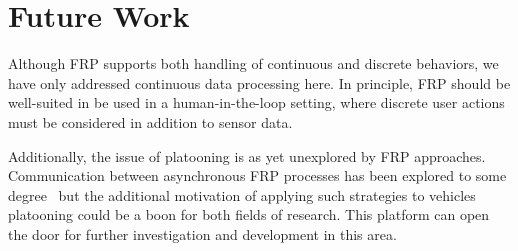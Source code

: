 \section{Future Work}

Although FRP supports both handling of continuous and discrete behaviors, we have only addressed continuous data processing here.
In principle, FRP should be well-suited in be used in a human-in-the-loop setting, where discrete user actions must be considered in addition to sensor data.

Additionally, the issue of platooning is as yet unexplored by FRP approaches.
Communication between asynchronous FRP processes has been explored to some degree~\cite{danwcAsync,HudakQSW15} but the additional motivation of applying such strategies to vehicles platooning could be a boon for both fields of research.
This platform can open the door for further investigation and development in this area.
